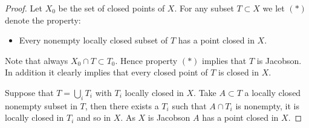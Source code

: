 \documentclass[10pt,a4paper]{amsart}
\theoremstyle{plain}
\theoremstyle{definition}
\theoremstyle{remark}
\numberwithin{equation}{subsection}
\begin{document}
\begin{proof}
Let $X_0$ be the set of closed points of $X$. For any subset
$T \subset X$ we let $(*)$ denote the property:
\begin{itemize}
\item[(*)] Every nonempty locally closed subset of $T$ has a point
closed in $X$.
\end{itemize}
Note that always $X_0 \cap T \subset T_0$. Hence property $(*)$
implies that $T$ is Jacobson. In addition it clearly implies
that every closed point of $T$ is closed in $X$.

\medskip\noindent
Suppose that $T=\bigcup_i T_i$ with $T_i$ locally closed in $X$.
Take $A\subset T$ a locally closed nonempty subset in $T$,
then there exists a $T_i$ such that $A\cap T_i$ is nonempty, it is
locally closed in $T_i$ and so in $X$.
As $X$ is Jacobson $A$ has a point closed in $X$.
\end{proof}
\end{document}
